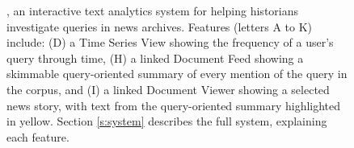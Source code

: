 
\begin{figure}[t!]
\centering
{}
\caption[The \ours~interface]{
\ours, an interactive text analytics system for helping historians investigate queries in news archives.
Features (letters A to K) include: (D) a Time Series View showing the frequency of a user's query through time, (H) a linked Document Feed showing a skimmable query-oriented summary of every mention of the query in the corpus, and (I) a linked Document Viewer showing a selected news story, with text from the query-oriented summary highlighted in yellow. 
Section \ref{s:system} describes the full system, explaining each feature.\vspace{.05cm}
}
\label{f:system_cc}
\end{figure}
